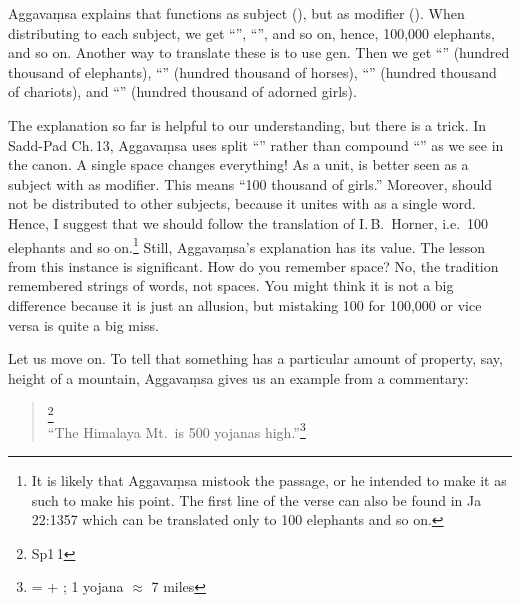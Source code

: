 Aggava\d msa explains that  functions as subject (), but  as modifier (). When distributing  to each subject, we get ``'', ``'', and so on, hence, 100,000 elephants, and so on. Another way to translate these is to use gen. Then we get ``'' (hundred thousand of elephants), ``'' (hundred thousand of horses), ``'' (hundred thousand of chariots), and ``'' (hundred thousand of ador\-ned girls).

The explanation so far is helpful to our understanding, but there is a trick. In Sadd-Pad Ch.\,13, Aggava\d msa uses split ``'' rather than compound ``'' as we see in the canon. A single space changes everything! As a unit,  is better seen as a subject with  as modifier. This means ``100 thousand of girls.'' Moreover,  should not be distributed to other subjects, because it unites with  as a single word. Hence, I suggest that we should follow the translation of I.\,B.\ Horner, i.e.\ 100 elephants and so on.\footnote{It is likely that Aggava\d msa mistook the passage, or he intended to make it as such to make his point. The first line of the verse can also be found in Ja\,22:1357 which can be translated only to 100 elephants and so on.} Still, Aggava\d msa's explanation has its value. The lesson from this instance is significant. How do you remember space? No, the tradition remembered strings of words, not spaces. You might think it is not a big difference because it is just an allusion, but mistaking 100 for 100,000 or vice versa is quite a big miss. 

Let us move on. To tell that something has a particular amount of property, say, height of a mountain, Aggava\d msa gives us an example from a commentary:

\begin{quote}
\footnote{Sp1\,1}\\
``The Himalaya Mt.\ is 500 yojanas high.''\footnote{ =  + ; 1 yojana $\approx$ 7 miles}
\end{quote}

